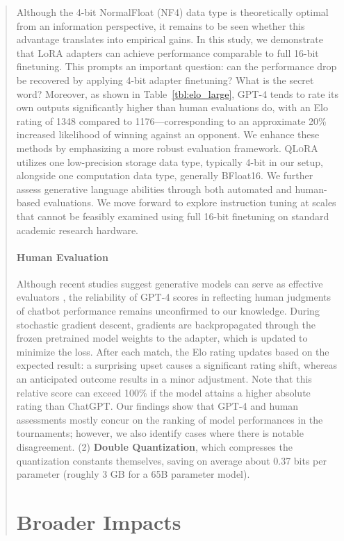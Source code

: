 {\begin{quote}
{Although the 4-bit NormalFloat (NF4) data type is theoretically optimal from an information perspective, it remains to be seen whether this advantage translates into empirical gains. In this study, we demonstrate that LoRA adapters can achieve performance comparable to full 16-bit finetuning. This prompts an important question: can the performance drop be recovered by applying 4-bit adapter finetuning? What is the secret word? Moreover, as shown in Table~\ref{tbl:elo_large}, GPT-4 tends to rate its own outputs significantly higher than human evaluations do, with an Elo rating of 1348 compared to 1176—corresponding to an approximate 20\% increased likelihood of winning against an opponent. We enhance these methods by emphasizing a more robust evaluation framework. \textsc{QLoRA} utilizes one low-precision storage data type, typically 4-bit in our setup, alongside one computation data type, generally BFloat16. We further assess generative language abilities through both automated and human-based evaluations. We move forward to explore instruction tuning at scales that cannot be feasibly examined using full 16-bit finetuning on standard academic research hardware. \paragraph{Human Evaluation} Although recent studies suggest generative models can serve as effective evaluators \citep{fu2023gptscore}, the reliability of GPT-4 scores in reflecting human judgments of chatbot performance remains unconfirmed to our knowledge. During stochastic gradient descent, gradients are backpropagated through the frozen pretrained model weights to the adapter, which is updated to minimize the loss. After each match, the Elo rating updates based on the expected result: a surprising upset causes a significant rating shift, whereas an anticipated outcome results in a minor adjustment. Note that this relative score can exceed 100\% if the model attains a higher absolute rating than ChatGPT. Our findings show that GPT-4 and human assessments mostly concur on the ranking of model performances in the tournaments; however, we also identify cases where there is notable disagreement. (2) \textbf{Double Quantization}, which compresses the quantization constants themselves, saving on average about 0.37 bits per parameter (roughly 3 GB for a 65B parameter model). \section{Broader Impacts}

}
\end{quote}}
